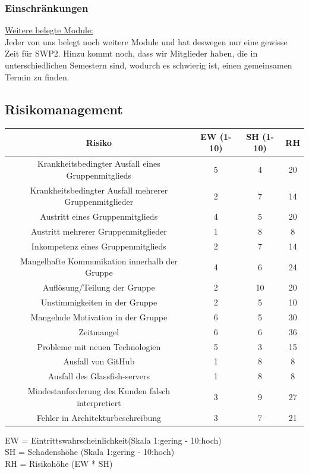\documentclass[fontsize=12pt,paper=a4,twoside]{scrartcl}
\begin{document}
\subsubsection{Einschränkungen}
\underline{Weitere belegte Module:} \\
Jeder von uns belegt noch weitere Module und hat deswegen nur eine gewisse Zeit für SWP2. Hinzu kommt noch, dass wir Mitglieder haben, die in unterschiedlichen Semestern sind, wodurch es schwierig ist, einen gemeinsamen Termin zu finden. \\

\subsection{Risikomanagement}\label{riskmanagement}

\begin{center}
\begin{tabular}{|c|c|c|c|} \hline 
\textbf{Risiko} & \textbf{EW (1-10)} & \textbf{SH (1-10)} & \textbf{RH}\\ \hline \hline
Krankheitsbedingter Ausfall eines Gruppenmitglieds & 5  & 4 & 20\\ \hline
Krankheitsbedingter Ausfall mehrerer Gruppenmitglieder & 2  & 7 & 14\\ \hline
Austritt eines Gruppenmitglieds & 4 & 5 & 20\\ \hline
Austritt mehrerer Gruppenmitglieder & 1 & 8 & 8\\ \hline
Inkompetenz eines Gruppenmitglieds & 2 & 7 & 14\\ \hline
Mangelhafte Kommunikation innerhalb der Gruppe & 4 & 6 & 24\\ \hline
Auflösung/Teilung der Gruppe & 2 & 10 & 20\\ \hline
Unstimmigkeiten in der Gruppe & 2 & 5 & 10\\ \hline
Mangelnde Motivation in der Gruppe & 6 & 5 & 30\\ \hline
Zeitmangel & 6 & 6 & 36\\ \hline
Probleme mit neuen Technologien & 5 & 3 & 15\\ \hline
Ausfall von GitHub & 1 & 8 & 8\\ \hline
Ausfall des Glassfish-servers & 1 & 8 & 8\\ \hline
Mindestanforderung des Kunden falsch interpretiert & 3 & 9 & 27\\ \hline
Fehler in Architekturbeschreibung & 3 & 7 & 21\\ \hline
\end{tabular}
\end{center}
EW = Eintrittswahrscheinlichkeit(Skala 1:gering - 10:hoch)\\
SH = Schadenshöhe (Skala 1:gering - 10:hoch)\\
RH = Risikohöhe (EW * SH)\\
\end{document}

